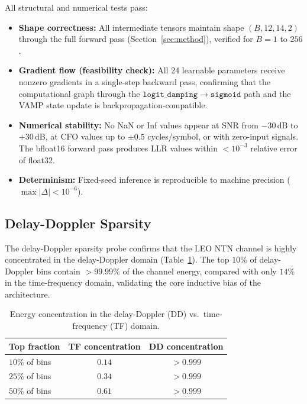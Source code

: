 \documentclass{article}
\begin{document}
All structural and numerical tests pass:
\begin{itemize}
  \item \textbf{Shape correctness:} All intermediate tensors maintain shape $(B, 12, 14, 2)$ through the full forward pass (Section~\ref{sec:method}), verified for $B = 1$ to $256$.
  \item \textbf{Gradient flow (feasibility check):} All 24 learnable parameters receive nonzero gradients in a single-step backward pass, confirming that the computational graph through the $\mathtt{logit\_damping} \to \mathtt{sigmoid}$ path and the VAMP state update is backpropagation-compatible.
  \item \textbf{Numerical stability:} No NaN or Inf values appear at SNR from $-30$\,dB to $+30$\,dB, at CFO values up to $\pm 0.5$ cycles/symbol, or with zero-input signals. The bfloat16 forward pass produces LLR values within $< 10^{-3}$ relative error of float32.
  \item \textbf{Determinism:} Fixed-seed inference is reproducible to machine precision ($\max|\Delta| < 10^{-6}$).
\end{itemize}

\subsection{Delay-Doppler Sparsity}

The delay-Doppler sparsity probe confirms that the LEO NTN channel is highly concentrated in the delay-Doppler domain (Table~\ref{tab:sparsity}). The top $10\%$ of delay-Doppler bins contain $> 99.99\%$ of the channel energy, compared with only $14\%$ in the time-frequency domain, validating the core inductive bias of the architecture.

\begin{table}[h]
  \centering
  \caption{Energy concentration in the delay-Doppler (DD) vs.\ time-frequency (TF) domain.}
  \label{tab:sparsity}
  \begin{tabular}{@{}lcc@{}}
    \toprule
    Top fraction & TF concentration & DD concentration \\
    \midrule
    $10\%$ of bins & $0.14$ & $> 0.999$ \\
    $25\%$ of bins & $0.34$ & $> 0.999$ \\
    $50\%$ of bins & $0.61$ & $> 0.999$ \\
    \bottomrule
  \end{tabular}
\end{table}
\end{document}
